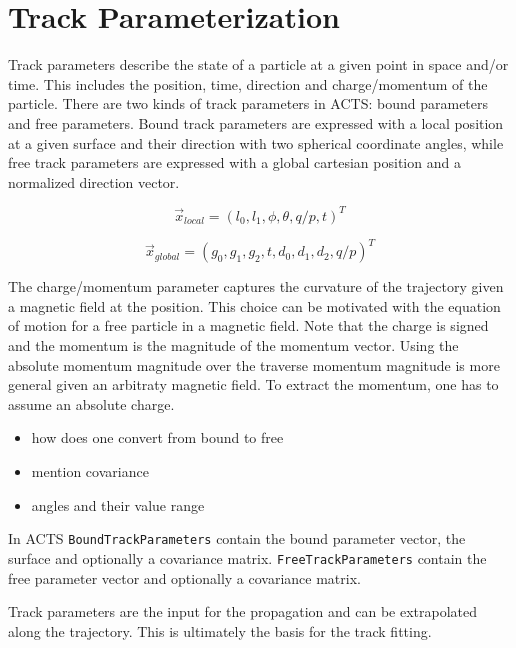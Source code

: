 \section{Track Parameterization}

Track parameters describe the state of a particle at a given point in space and/or time. This includes the position, time, direction and charge/momentum of the particle. There are two kinds of track parameters in ACTS: bound parameters and free parameters. Bound track parameters are expressed with a local position at a given surface and their direction with two spherical coordinate angles, while free track parameters are expressed with a global cartesian position and a normalized direction vector.

\begin{equation*}
    \vec x_{local} = \left(l_0, l_1, \phi, \theta, q/p, t\right)^T
\end{equation*}

\begin{equation*}
    \vec x_{global} = \left(g_0, g_1, g_2, t, d_0, d_1, d_2, q/p\right)^T
\end{equation*}

The charge/momentum parameter captures the curvature of the trajectory given a magnetic field at the position. This choice can be motivated with the equation of motion for a free particle in a magnetic field. Note that the charge is signed and the momentum is the magnitude of the momentum vector. Using the absolute momentum magnitude over the traverse momentum magnitude is more general given an arbitraty magnetic field. To extract the momentum, one has to assume an absolute charge.

\begin{itemize}
    \color{red}
    \item how does one convert from bound to free
    \item mention covariance
    \item angles and their value range
\end{itemize}

In ACTS \texttt{BoundTrackParameters} contain the bound parameter vector, the surface and optionally a covariance matrix. \texttt{FreeTrackParameters} contain the free parameter vector and optionally a covariance matrix.

Track parameters are the input for the propagation and can be extrapolated along the trajectory. This is ultimately the basis for the track fitting.

